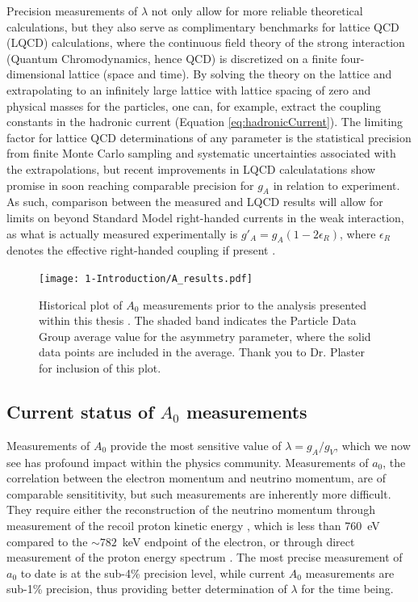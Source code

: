 Precision measurements of $\lambda$ not only allow for more reliable theoretical calculations, but
they also serve as complimentary benchmarks for lattice QCD (LQCD) calculations, where the continuous
field theory of the strong interaction (Quantum Chromodynamics, hence QCD)
is discretized on a finite four-dimensional lattice (space and time). By solving the theory on
the lattice and extrapolating to an infinitely large lattice with lattice spacing of zero 
and physical masses for the particles, one can, for example, extract the coupling constants in the
hadronic current (Equation \ref{eq:hadronicCurrent}). The limiting factor for lattice QCD
determinations of any parameter is the statistical precision from finite Monte Carlo sampling
and systematic uncertainties associated with the extrapolations, but recent improvements in
LQCD calculatations \cite{bhattacharya2016,capitani2017iso,berkowitz2017accurate}
show promise in soon reaching comparable precision for $g_A$ in relation to
experiment. As such, comparison between the measured and LQCD results will allow for limits on
beyond Standard Model right-handed currents in the weak interaction, as what is actually measured experimentally
is $g'_A = g_A(1-2\epsilon_R)$, where $\epsilon_R$ denotes the effective right-handed coupling if present
\cite{cirigliano2013beta,gonzalez2016global,alioli2017right}.

\begin{figure} [h]
  \centering
  \texttt{[image: 1-Introduction/A\_results.pdf]}
  \caption{Historical plot of $A_0$ measurements prior to the analysis presented within
    this thesis
    \cite{bopp1986,erozolimskii1991new,yerozolimsky1997,liaud1997,abele2002,mund2013,mendenhall2013}.
    The shaded band indicates the Particle Data Group average value \cite{pdg}
    for the asymmetry parameter, where the solid data points are included in the average. Thank you
    to Dr. Plaster for inclusion of this plot.}
  \label{fig:Ameasurements}
\end{figure}


\subsection{Current status of $A_0$ measurements} \label{ssec:Previous_results}

Measurements of $A_0$ provide the most sensitive value of $\lambda = g_A/g_V$,
which we now see has profound impact within the physics community.
Measurements of $a_0$, the correlation between the electron momentum and
neutrino momentum, are of comparable sensititivity, but such measurements are inherently more difficult.
They require either the reconstruction of the neutrino momentum through measurement of the recoil proton
kinetic energy \cite{darius2017measurement}, which is less than 760~eV compared to the $\sim782$~keV endpoint
of the electron, or through direct measurement of
the proton energy spectrum \cite{byrne2002determination}. The most precise measurement of $a_0$ to date
is at the sub-4\% precision level, while current $A_0$ measurements are sub-1\% precision, thus providing
better determination of $\lambda$ for the time being.


